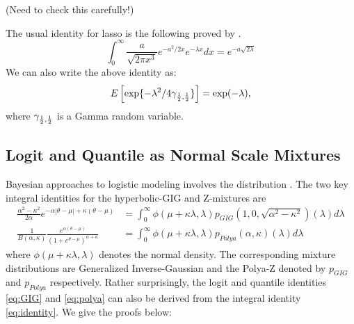 \documentclass[lineno]{biometrika}
\begin{document}
\begin{remark}
(Need to check this carefully!) 

The usual identity for lasso is the following proved by \citet{levy1940certains}.
$$
\int_{0}^{\infty} \frac{a}{\sqrt{2\pi x^3}} e^{-a^2/2x} e^{-\lambda x} dx = e^{-a\sqrt{2\lambda}} 
$$
We can also write the above identity as: 
$$
E \left[\exp\{-\lambda^2/4\gamma_{\frac{1}{2},\frac{1}{2}} \} \right] = \exp(-\lambda), 
$$ where $\gamma_{\frac{1}{2}, \frac{1}{2}}$ is a Gamma random variable. 
\end{remark} 

\subsection{Logit and Quantile as Normal Scale Mixtures}
Bayesian approaches to logistic modeling involves the \PG distribution \citep{polson2013bayesian}. The two key integral identities for the hyperbolic-GIG \citep{barndorff1977infinite} and Z-\Polya mixtures \citep{polson2013bayesian,barndorff1982normal} are 
\begin{align}
\frac{\alpha^2-\kappa^2}{2\alpha} e^{-\alpha|\theta-\mu| + \kappa(\theta-\mu)} & = \int_0^{\infty} \phi(\mu + \kappa \lambda, \lambda) p_{GIG}(1,0,\sqrt{\alpha^2-\kappa^2}) (\lambda) d\lambda \label{eq:GIG}\\
\frac{1}{B(\alpha,\kappa)} \frac{e^{\alpha(\theta-\mu)}}{(1+e^{\theta-\mu})^{\alpha + \kappa}} & = \int_0^{\infty} \phi(\mu + \kappa \lambda, \lambda) p_{Polya}(\alpha,\kappa) (\lambda) d\lambda \label{eq:polya}
\end{align}
where $\phi(\mu + \kappa \lambda, \lambda)$ denotes the normal density. The corresponding mixture distributions are Generalized Inverse-Gaussian and the Polya-Z denoted by $p_{GIG}$ and $p_{Polya}$ respectively. Rather surprisingly, the logit and quantile identities \eqref{eq:GIG} and \eqref{eq:polya} can also be derived from the integral identity \eqref{eq:identity}. We give the proofs below: 
\end{document}
